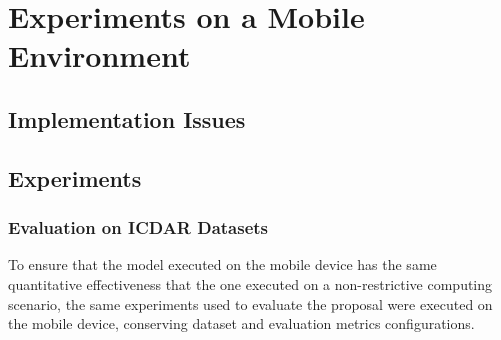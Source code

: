 \chapter{Experiments on a Mobile Environment}
\label{chap:mobile-results}



\section{Implementation Issues}



\section{Experiments}



\subsection{Evaluation on ICDAR Datasets}

To ensure that the model executed on the mobile device has the same quantitative effectiveness that the one executed on a non-restrictive computing scenario, the same experiments used to evaluate the proposal were executed on the mobile device, conserving dataset and evaluation metrics configurations. 









    